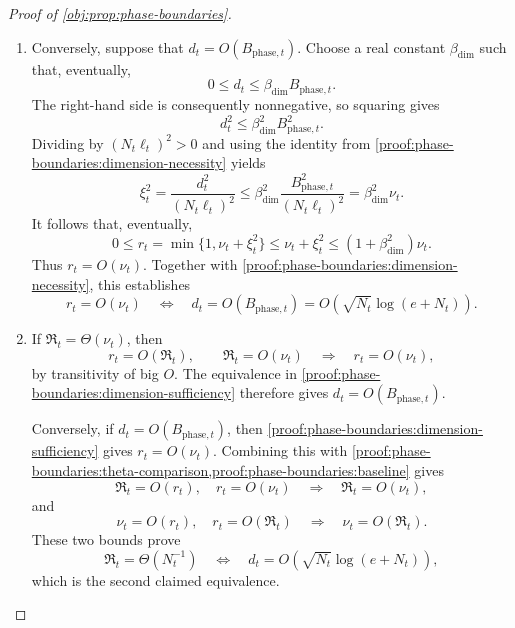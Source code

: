 \documentclass[11pt]{article}
\begin{document}
\begin{proof}[Proof of \cref{obj:prop:phase-boundaries}]
\begin{enumerate}
\item\label{proof:phase-boundaries:dimension-sufficiency} Conversely, suppose that \(d_t=O(B_{\mathrm{phase},t})\). Choose a real constant
\(\beta_{\mathrm{dim}}\) such that, eventually,
\[
0\le d_t\le\beta_{\mathrm{dim}}B_{\mathrm{phase},t}.
\]
The right-hand side is consequently nonnegative, so squaring gives
\[
d_t^2\le\beta_{\mathrm{dim}}^2B_{\mathrm{phase},t}^2.
\]
Dividing by \((N_t\ell_t)^2>0\) and using the identity from \cref{proof:phase-boundaries:dimension-necessity} yields
\[
\xi_t^2
=\frac{d_t^2}{(N_t\ell_t)^2}
\le
\beta_{\mathrm{dim}}^2
\frac{B_{\mathrm{phase},t}^2}{(N_t\ell_t)^2}
=\beta_{\mathrm{dim}}^2\nu_t.
\]
It follows that, eventually,
\[
0\le r_t
=\min\{1,\nu_t+\xi_t^2\}
\le\nu_t+\xi_t^2
\le(1+\beta_{\mathrm{dim}}^2)\nu_t.
\]
Thus \(r_t=O(\nu_t)\). Together with \cref{proof:phase-boundaries:dimension-necessity}, this establishes
\[
r_t=O(\nu_t)
\quad\Longleftrightarrow\quad
d_t=O(B_{\mathrm{phase},t})
=O\!\left(\sqrt{N_t}\log(e+N_t)\right).
\]

\item If \(\mathfrak R_t=\Theta(\nu_t)\), then
\[
r_t=O(\mathfrak R_t),
\qquad
\mathfrak R_t=O(\nu_t)
\quad\Longrightarrow\quad
r_t=O(\nu_t),
\]
by transitivity of big \(O\). The equivalence in \cref{proof:phase-boundaries:dimension-sufficiency} therefore gives
\(d_t=O(B_{\mathrm{phase},t})\).

Conversely, if \(d_t=O(B_{\mathrm{phase},t})\), then \cref{proof:phase-boundaries:dimension-sufficiency} gives \(r_t=O(\nu_t)\). Combining this with \cref{proof:phase-boundaries:theta-comparison,proof:phase-boundaries:baseline} gives
\[
\mathfrak R_t=O(r_t),\quad r_t=O(\nu_t)
\quad\Longrightarrow\quad
\mathfrak R_t=O(\nu_t),
\]
and
\[
\nu_t=O(r_t),\quad r_t=O(\mathfrak R_t)
\quad\Longrightarrow\quad
\nu_t=O(\mathfrak R_t).
\]
These two bounds prove
\[
\mathfrak R_t=\Theta(N_t^{-1})
\quad\Longleftrightarrow\quad
d_t=O\!\left(\sqrt{N_t}\log(e+N_t)\right),
\]
which is the second claimed equivalence.
\end{enumerate}
\end{proof}
\end{document}
